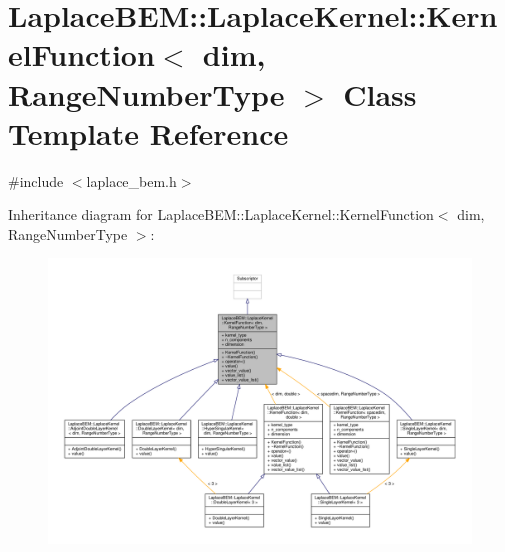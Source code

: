\hypertarget{classLaplaceBEM_1_1LaplaceKernel_1_1KernelFunction}{}\section{Laplace\+B\+EM\+:\+:Laplace\+Kernel\+:\+:Kernel\+Function$<$ dim, Range\+Number\+Type $>$ Class Template Reference}
\label{classLaplaceBEM_1_1LaplaceKernel_1_1KernelFunction}


{\ttfamily \#include $<$laplace\+\_\+bem.\+h$>$}



Inheritance diagram for Laplace\+B\+EM\+:\+:Laplace\+Kernel\+:\+:Kernel\+Function$<$ dim, Range\+Number\+Type $>$\+:\nopagebreak
\begin{figure}[H]
\begin{center}
\leavevmode
\includegraphics[width=350pt]{classLaplaceBEM_1_1LaplaceKernel_1_1KernelFunction__inherit__graph}
\end{center}
\end{figure}


